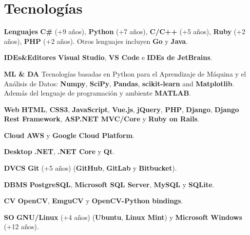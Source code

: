 \documentclass[]{friggeri-cv}
\begin{document}
\section{Tecnologías}
\begin{entrylist}
  \entry
    {\textbf{Lenguajes}}
    {}
    {}
    {\textbf{C\#} (+9 años), \textbf{Python} (+7 años), \textbf{C/C++} (+5 años), \textbf{Ruby} (+2 años), \textbf{PHP} (+2 años). Otros lenguajes incluyen \textbf{Go} y \textbf{Java}.}

  \entry
    {\textbf{IDEs\&Editores}}
    {}
    {}
    {\textbf{Visual Studio}, \textbf{VS Code} e \textbf{IDEs de JetBrains}.}

  \entry
    {\textbf{ML \& DA}}
    {}
    {}
    {Tecnologías basadas en Python para el Aprendizaje de Máquina y el Análisis de Datos: \textbf{Numpy}, \textbf{SciPy}, \textbf{Pandas}, \textbf{scikit-learn} and \textbf{Matplotlib}. Además del lenguaje de programación y ambiente \textbf{MATLAB}.}

  \entry
    {\textbf{Web}}
    {}
    {}
    {\textbf{HTML}, \textbf{CSS3}, \textbf{JavaScript}, \textbf{Vue.js}, \textbf{jQuery}, \textbf{PHP}, \textbf{Django}, \textbf{Django Rest Framework}, \textbf{ASP.NET MVC/Core} y \textbf{Ruby on Rails}.}

  \entry
    {\textbf{Cloud}}
    {}
    {}
    {\textbf{AWS} y \textbf{Google Cloud Platform}.}

  \entry
    {\textbf{Desktop}}
    {}
    {}
    {\textbf{.NET}, \textbf{.NET Core} y \textbf{Qt}.}

\end{entrylist}

\begin{entrylist}

  \entry
    {\textbf{DVCS}}
    {}
    {}
    {\textbf{Git} (+5 años) (\textbf{GitHub}, \textbf{GitLab} y \textbf{Bitbucket}).}
    
  \entry
    {\textbf{DBMS}}
    {}
    {}
    {\textbf{PostgreSQL}, \textbf{Microsoft SQL Server}, \textbf{MySQL} y \textbf{SQLite}.}
    
  \entry
    {\textbf{CV}}
    {}
    {}
    {\textbf{OpenCV}, \textbf{EmguCV} y \textbf{OpenCV-Python bindings}.}    

  \entry
    {\textbf{SO}}
    {}
    {}
    {\textbf{GNU/Linux} (+4 años) (\textbf{Ubuntu}, \textbf{Linux Mint}) y \textbf{Microsoft Windows} (+12 años).}
\end{entrylist}
\end{document}
